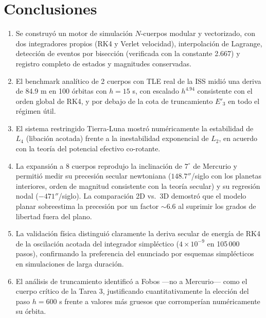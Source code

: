 \documentclass[11pt, a4paper]{article}
\begin{document}
\section{Conclusiones}

\begin{enumerate}
	\item Se construyó un motor de simulación $N$-cuerpos modular y vectorizado, con dos integradores propios (RK4 y Verlet velocidad), interpolación de Lagrange, detección de eventos por bisección (verificada con la constante 2.667) y registro completo de estados y magnitudes conservadas.
	\item El benchmark analítico de 2 cuerpos con TLE real de la ISS midió una deriva de 84.9 m en 100 órbitas con $h = 15$ s, con escalado $h^{4.94}$ consistente con el orden global de RK4, y por debajo de la cota de truncamiento $E'_3$ en todo el régimen útil.
	\item El sistema restringido Tierra-Luna mostró numéricamente la estabilidad de $L_4$ (libación acotada) frente a la inestabilidad exponencial de $L_2$, en acuerdo con la teoría del potencial efectivo co-rotante.
	\item La expansión a 8 cuerpos reprodujo la inclinación de $7^\circ$ de Mercurio y permitió medir su precesión secular newtoniana ($148.7''$/siglo con los planetas interiores, orden de magnitud consistente con la teoría secular) y su regresión nodal ($-471''$/siglo). La comparación 2D vs.\ 3D demostró que el modelo planar sobreestima la precesión por un factor $\sim 6.6$ al suprimir los grados de libertad fuera del plano.
	\item La validación física distinguió claramente la deriva secular de energía de RK4 de la oscilación acotada del integrador simpléctico ($4\times10^{-9}$ en 105\,000 pasos), confirmando la preferencia del enunciado por esquemas simplécticos en simulaciones de larga duración.
	\item El análisis de truncamiento identificó a Fobos ---no a Mercurio--- como el cuerpo crítico de la Tarea 3, justificando cuantitativamente la elección del paso $h = 600$ s frente a valores más gruesos que corromperían numéricamente su órbita.
\end{enumerate}
\end{document}
